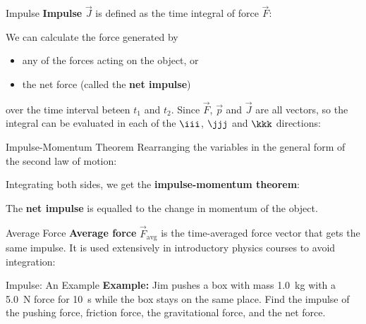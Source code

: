 \documentclass[12pt,compress,aspectratio=169]{beamer}
\begin{document}
\begin{frame}{Impulse}
  \textbf{Impulse} $\vec J$ is defined as the time integral of force $\vec F$:


  We can calculate the force generated by
  \begin{itemize}
  \item any of the forces acting on the object, or
  \item the net force (called the \textbf{net impulse})
  \end{itemize}
  over the time interval beteen $t_1$ and $t_2$. Since $\vec F$, $\vec p$ and
  $\vec J$ are all vectors, so the integral can be evaluated in each of the
  $\iii$, $\jjj$ and $\kkk$ directions:
  
\end{frame}



\begin{frame}{Impulse-Momentum Theorem}
  Rearranging the variables in the general form of the second law of motion:
  

  Integrating both sides, we get the \textbf{impulse-momentum theorem}:
 
  
  The \textbf{net impulse} is equalled to the change in momentum of the object.
\end{frame}



\begin{frame}{Average Force}
  \textbf{Average force} $\vec F_\text{avg}$ is the time-averaged force vector
  that gets the same impulse. It is used extensively in introductory physics
  courses to avoid integration:

\end{frame}



\begin{frame}{Impulse: An Example}
  \textbf{Example:} Jim pushes a box with mass \SI{1.0}{\kilo\gram} with a
  \SI{5.0}{\newton} force for \SI{10}{\second} while the box stays on the same
  place. Find the impulse of the pushing force, friction force, the
  gravitational force, and the net force.
\end{frame}
\end{document}

